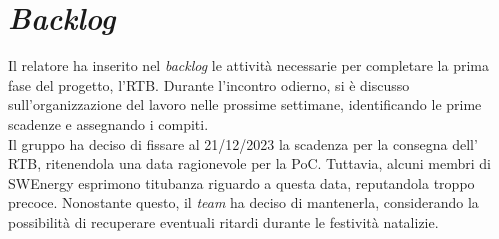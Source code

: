 \section{\textit{Backlog}}

Il relatore ha inserito nel \textit{backlog} le attività necessarie per
completare la prima fase del progetto, l'RTB. Durante l'incontro odierno, si è
discusso sull'organizzazione del lavoro nelle prossime settimane,
identificando le prime scadenze e assegnando i compiti. \\
Il gruppo ha deciso di fissare al 21/12/2023 la scadenza per la consegna dell'
RTB, ritenendola una data ragionevole per la PoC. Tuttavia, alcuni membri di
SWEnergy esprimono titubanza riguardo a questa data, reputandola troppo precoce.
Nonostante questo, il \textit{team} ha deciso di mantenerla, considerando la
possibilità di recuperare eventuali ritardi durante le festività natalizie.
